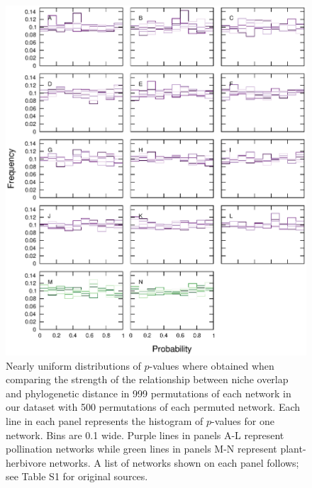 \documentclass[12pt]{article}
\begin{document}
\begin{spacing}{1.0}
    \begin{figure}[!h]
        \begin{center}
          \centerline{\includegraphics*[width=.99\textwidth]{Figures/random_p_distributions.eps}}
        \end{center}
        \vspace{-1cm}
         \caption{\small Nearly uniform distributions of $p$-values where obtained when comparing the strength of the relationship between niche overlap and phylogenetic distance in 999 permutations of each network in our dataset with 500 permutations of each permuted network. Each line in each panel represents the histogram of $p$-values for one network. Bins are 0.1 wide. Purple lines in panels A-L represent pollination networks while green lines in panels M-N represent plant-herbivore networks. A list of networks shown on each panel follows; see Table S1 for original sources.
}
\end{figure}
\end{spacing}
\end{document}
